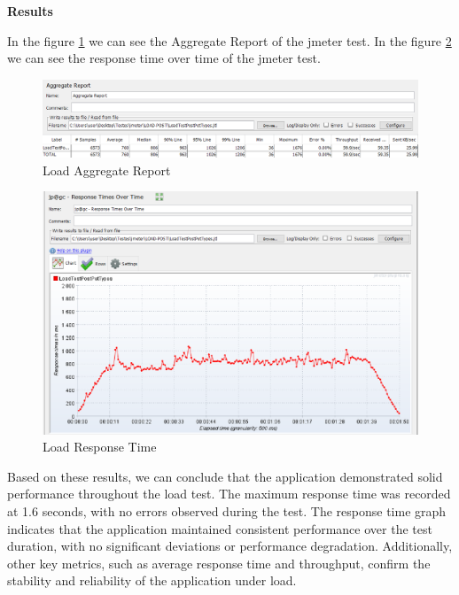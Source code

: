 \documentclass[a4paper,11pt,openright,BCOR=15mm]{scrbook}
\begin{document}
\textbf{Results}

In the figure \ref{fig:LoadAggregatejMeter} we can see the Aggregate Report of the jmeter test. In the figure \ref{fig:LoadResponsejMeter} we can see the response time over time of the jmeter test. 

\begin{figure}[H]
	\centering
	\includegraphics[width=\textwidth]{figs/Performance/jmeter/LoadPostAgregateResult.png}
	\caption{Load Aggregate Report}
	\label{fig:LoadAggregatejMeter}
\end{figure}

\begin{figure}[H]
	\centering
	\includegraphics[width=\textwidth]{figs/Performance/jmeter/LoadPostResponsesOverTime.png}
	\caption{Load Response Time}
	\label{fig:LoadResponsejMeter}
\end{figure}

Based on these results, we can conclude that the application demonstrated solid performance throughout the load test. The maximum response time was recorded at 1.6 seconds, with no errors observed during the test. The response time graph indicates that the application maintained consistent performance over the test duration, with no significant deviations or performance degradation. Additionally, other key metrics, such as average response time and throughput, confirm the stability and reliability of the application under load.
\end{document}
